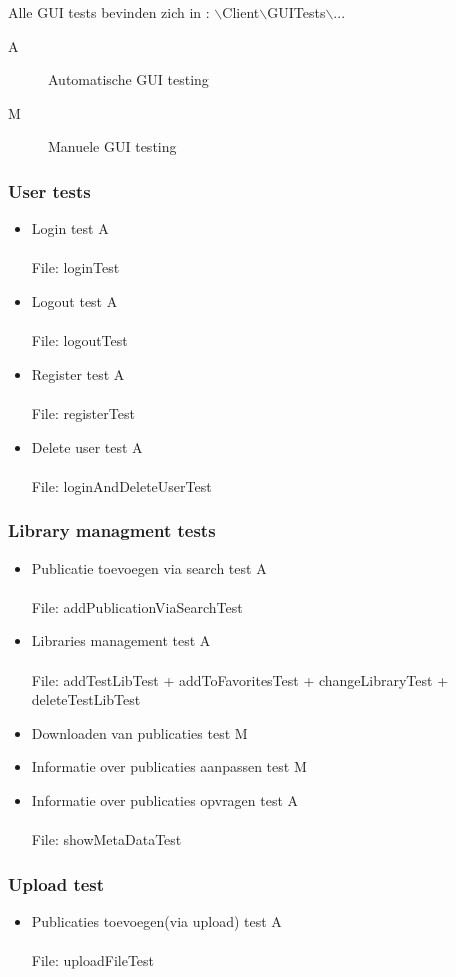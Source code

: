 \documentclass{article}
\begin{document}
Alle GUI tests bevinden zich in : $\backslash$Client$\backslash$GUITests$\backslash$...\\

\begin{description}
\item[A] Automatische GUI testing
\item[M] Manuele GUI testing
\end{description}
\subsubsection{User tests}
\begin{itemize}
  \item Login test A\\\\
  File: loginTest
  \item Logout test A\\\\
  File: logoutTest
  \item Register test A\\\\
  File: registerTest
  \item Delete user test A\\\\
  File: loginAndDeleteUserTest
\end{itemize}
\subsubsection{Library managment tests}
\begin{itemize}
  \item Publicatie toevoegen via search test A\\\\
  File: addPublicationViaSearchTest
  \item Libraries management test A\\\\
  File: addTestLibTest + addToFavoritesTest + changeLibraryTest + deleteTestLibTest
  \item Downloaden van publicaties test M
  \item Informatie over publicaties aanpassen test M
  \item Informatie over publicaties opvragen test A\\\\
  File: showMetaDataTest
\end{itemize}
\subsubsection{Upload test}
\begin{itemize}
  \item Publicaties toevoegen(via upload) test A\\\\
  File: uploadFileTest
\end{itemize}
\end{document}

